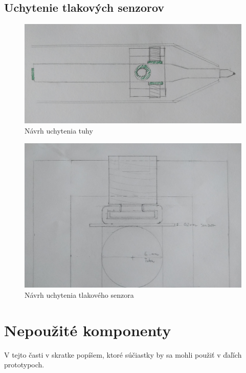 \subsection*{Uchytenie tlakových senzorov}

\begin{figure}[hbt]
	\centering
	\includegraphics[width=1\textwidth]{obrazky-figures/umiestnenie_tlakovych_senzorov.png}
	\caption{Návrh uchytenia tuhy}
	\label{piezoPen1997}
\end{figure}

\begin{figure}[hbt]
	\centering
	\includegraphics[width=1\textwidth]{obrazky-figures/uchytenie.png}
	\caption{Návrh uchytenia tlakového senzora}
	\label{piezoPen1997}
\end{figure}

\section{Nepoužité komponenty}

V tejto časti v skratke popíšem, ktoré súčiastky by sa mohli použiť v ďaľích prototypoch.

